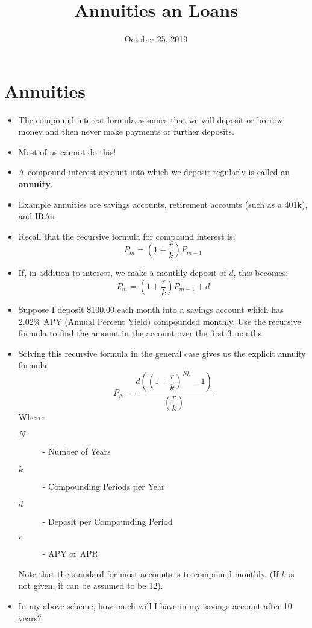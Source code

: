 \documentclass{article}
\title{Annuities an Loans}
\date{October 25, 2019}
\begin{document}
\maketitle

\section{Annuities}
\begin{itemize}
    \item The compound interest formula assumes that we will deposit
        or borrow money and then never make payments or further deposits.
    \item Most of us cannot do this!
    \item A compound interest account into which we deposit regularly
        is called an \textbf{annuity}.
    \item Example annuities are savings accounts, retirement accounts
        (such as a 401k), and IRAs.
    \item Recall that the recursive formula for compound interest is:
        \[
            P_m = \left(1+\dfrac{r}{k}\right) P_{m-1}
        \]
    \item If, in addition to interest, we make a monthly deposit of
        $d$, this becomes:
        \[
            P_m = \left(1+\dfrac{r}{k}\right) P_{m-1} + d
        \]
    \item Suppose I deposit \$100.00 each month into a savings account
        which has 2.02\% APY (Annual Percent Yield) compounded
        monthly.  Use the recursive formula to find the amount in the
        account over the first 3 months.
    \item Solving this recursive formula in the general case gives us
        the explicit annuity formula:
        \[
            P_N = \dfrac{d\left(\left(1+\dfrac{r}{k}\right)^{Nk} - 1 \right)}%
                        {\left(\dfrac{r}{k}\right)}
        \]
        Where:
        \begin{description}
            \item[$N$] - Number of Years
            \item[$k$] - Compounding Periods per Year
            \item[$d$] - Deposit per Compounding Period
            \item[$r$] - APY or APR
        \end{description}
        Note that the standard for most accounts is to compound
        monthly.  (If $k$ is not given, it can be assumed to be 12).

    \item In my above scheme, how much will I have in my savings
        account after 10 years?
\end{itemize}
\end{document}
